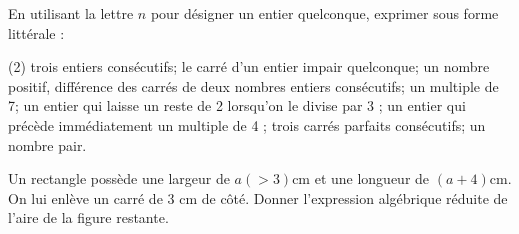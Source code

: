 \documentclass[a4paper,12pt]{report}
\begin{document}
\vspace*{-2\baselineskip}
\begin{acti}
En utilisant la lettre $n$ pour désigner un entier quelconque, exprimer sous forme littérale :
\begin{tasks}(2)
\task trois entiers consécutifs;
\task le carré d'un entier impair quelconque;
\task un nombre positif, différence des carrés de deux nombres entiers consécutifs;
\task un multiple de 7;
\task un entier qui laisse un reste de 2 lorsqu'on le divise par 3 ;
\task un entier qui précède immédiatement un multiple de 4 ;
\task trois carrés parfaits consécutifs;
\task un nombre pair.
\end{tasks}
\end{acti}
\begin{acti}
Un rectangle possède une largeur de $a(>3) \mathrm{cm}$ et une longueur de $(a+4) \mathrm{cm}$. On lui enlève un carré de 3 cm de côté. Donner l'expression algébrique réduite de l'aire de la figure restante.
\end{acti}
\end{document}
